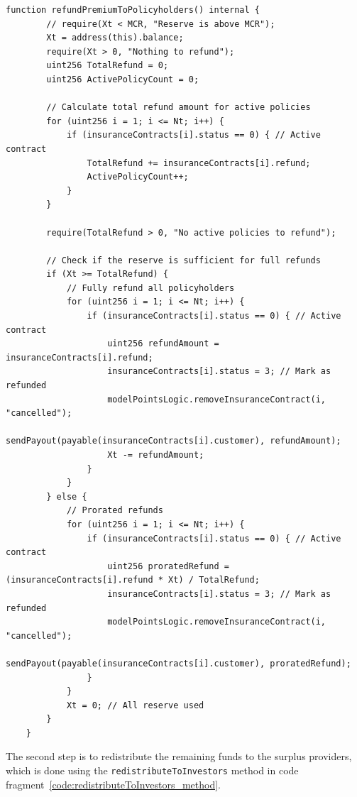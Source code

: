 \documentclass[10pt]{article}
\begin{document}
\begin{codefragment}[!h]
\begin{lstlisting}[language=Solidity]
function refundPremiumToPolicyholders() internal {
        // require(Xt < MCR, "Reserve is above MCR");
        Xt = address(this).balance;
        require(Xt > 0, "Nothing to refund");
        uint256 TotalRefund = 0;
        uint256 ActivePolicyCount = 0;

        // Calculate total refund amount for active policies
        for (uint256 i = 1; i <= Nt; i++) {
            if (insuranceContracts[i].status == 0) { // Active contract
                TotalRefund += insuranceContracts[i].refund;
                ActivePolicyCount++;
            }
        }

        require(TotalRefund > 0, "No active policies to refund");

        // Check if the reserve is sufficient for full refunds
        if (Xt >= TotalRefund) {
            // Fully refund all policyholders
            for (uint256 i = 1; i <= Nt; i++) {
                if (insuranceContracts[i].status == 0) { // Active contract
                    uint256 refundAmount = insuranceContracts[i].refund;
                    insuranceContracts[i].status = 3; // Mark as refunded
                    modelPointsLogic.removeInsuranceContract(i, "cancelled");
                    sendPayout(payable(insuranceContracts[i].customer), refundAmount);
                    Xt -= refundAmount;
                }
            }
        } else {
            // Prorated refunds
            for (uint256 i = 1; i <= Nt; i++) {
                if (insuranceContracts[i].status == 0) { // Active contract
                    uint256 proratedRefund = (insuranceContracts[i].refund * Xt) / TotalRefund;
                    insuranceContracts[i].status = 3; // Mark as refunded
                    modelPointsLogic.removeInsuranceContract(i, "cancelled");
                    sendPayout(payable(insuranceContracts[i].customer), proratedRefund);
                }
            }
            Xt = 0; // All reserve used
        }
    }
                \end{lstlisting}
\caption{\texttt{refundPremiumToPolicyholders} method of \texttt{InsuranceLogic}}
    \label{code:refundPremiumToPolicyholders_method}
\end{codefragment}

The second step is to redistribute the remaining funds to the surplus providers, which is done using the \texttt{redistributeToInvestors} method in code fragment~\ref{code:redistributeToInvestors_method}.
\end{document}
